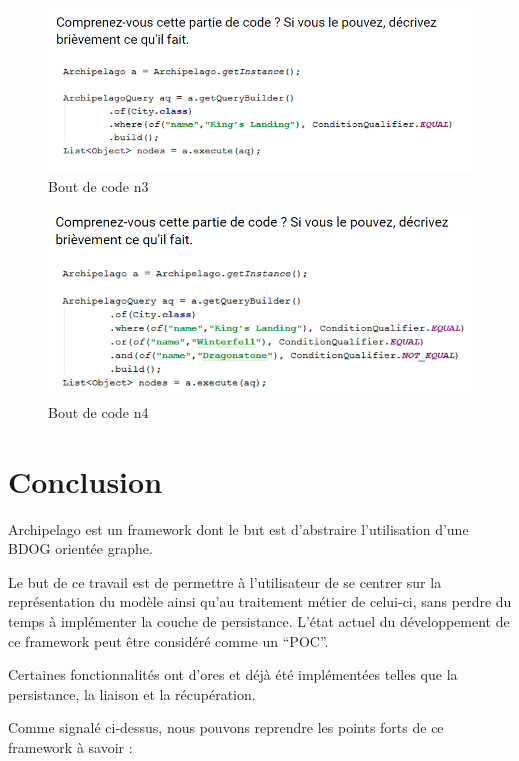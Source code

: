 \documentclass[a4paper,fleqn,12pt,oneside]{report}
\begin{document}
\begin{figure}[!ht]
\centering
\includegraphics[scale=0.8]{figures/Snippet3.png}
\caption{Bout de code n3}
\label{fig:Snippet3}
\end{figure}

\begin{figure}[!ht]
\centering
\includegraphics[scale=0.8]{figures/Snippet4.png}
\caption{Bout de code n4}
\label{fig:Snippet4}
\end{figure}

\chapter{Conclusion}

Archipelago est un framework dont le but est d'abstraire l'utilisation d'une BDOG orientée graphe. 

Le but de ce travail est de permettre à l'utilisateur de se centrer sur la représentation du modèle ainsi qu'au traitement métier de celui-ci, sans perdre du temps à implémenter la couche de persistance. L'état actuel du développement de ce framework peut être considéré comme un \enquote{POC}.

Certaines fonctionnalités ont d'ores et déjà été implémentées telles que la persistance, la liaison et la récupération.

Comme signalé ci-dessus, nous pouvons reprendre les points forts de ce framework à savoir :
\end{document}
